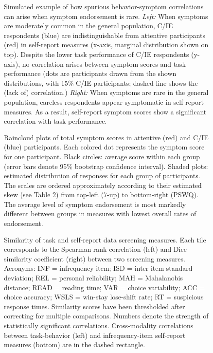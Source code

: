 \documentclass[a4paper,notitlepage,12pt]{article}
\begin{document}
\begin{refsection}[main]
\begin{figure}[h]
    \centering
    \captionsetup{width=0.88\textwidth}
    \caption{Simulated example of how spurious behavior-symptom correlations can arise when symptom endorsement is rare. \textit{Left:} When symptoms are moderately common in the general population, C/IE respondents (blue) are indistinguishable from attentive participants (red) in self-report measures (x-axis, marginal distribution shown on top). Despite the lower task performance of C/IE respondents (y-axis), no correlation arises between symptom scores and task performance (dots are participants drawn from the shown distributions, with 15\% C/IE participants; dashed line shows the (lack of) correlation.) \textit{Right:} When symptoms are rare in the general population, careless respondents appear symptomatic in self-report measures. As a result, self-report symptom scores show a significant correlation with task performance.}
    \label{fig:simulation}
\end{figure}

\clearpage
\begin{figure}[h]
    \centering
    \captionsetup{width=0.88\textwidth}
    \caption{Raincloud plots of total symptom scores in attentive (red) and C/IE (blue) participants. Each colored dot represents the symptom score for one participant. Black circles: average score within each group (error bars denote 95\% bootstrap confidence interval). Shaded plots: estimated distribution of responses for each group of participants. The scales are ordered approximately according to their estimated skew (see Table 2) from top-left (7-up) to bottom-right (PSWQ). The average level of symptom endorsement is most markedly different between groups in measures with lowest overall rates of endorsement.}
    \label{fig:distributions}
\end{figure}

\clearpage
\begin{figure}[h]
    \centering
    \captionsetup{width=0.88\textwidth}
    \caption{Similarity of task and self-report data screening measures. Each tile corresponds to the Spearman rank correlation (left) and Dice similarity coefficient (right) between two screening measures. Acronyms: INF = infrequency item; ISD = inter-item standard deviation; REL = personal reliability; MAH = Mahalanobis distance; READ = reading time; VAR = choice variability; ACC = choice accuracy; WSLS = win-stay lose-shift rate; RT = suspicious response times. Similarity scores have been thresholded after correcting for multiple comparisons. Numbers denote the strength of statistically significant correlations. Cross-modality correlations between task-behavior (left) and infrequency-item self-report measures (bottom) are in the dashed rectangle.}
    \label{fig:correspondence}
\end{figure}


\end{refsection}
\end{document}
